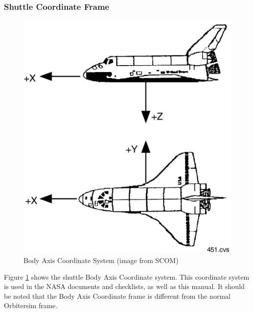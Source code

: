 \documentclass[13pt]{article}
\begin{document}
\begin{multicols*}{2}
\subsubsection{Shuttle Coordinate Frame}
\begin{figure}[H]
  \includegraphics[scale=0.5]{ShuttleBodyAxisSystem.png}
  \caption{Body Axis Coordinate System (image from SCOM)}
  \label{fig:BodyAxisSystem}
\end{figure}
Figure \ref{fig:BodyAxisSystem} shows the shuttle Body Axis Coordinate system. This coordinate system is used in the NASA documents and checklists, as well as this manual.
It should be noted that the Body Axis Coordinate frame is different from the normal Orbitersim frame.


\end{multicols*}
\end{document}

